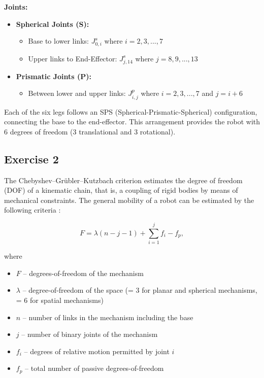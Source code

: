 \begin{solution}
\begin{description}
	\item \textbf{Joints:}
	\begin{itemize}
		\item \textbf{Spherical Joints (S):} 
		\begin{itemize}
			\item Base to lower links: $J^s_{0,i}$ where $i = 2, 3, ..., 7$
			\item Upper links to End-Effector: $J^s_{j,14}$ where $j = 8, 9, ..., 13$
		\end{itemize}
		\item \textbf{Prismatic Joints (P):} 
		\begin{itemize}
			\item Between lower and upper links: $J^p_{i,j}$ where $i = 2, 3, ..., 7$ and $j = i+6$
		\end{itemize}
	\end{itemize}
	
	\item[Structure:] Each of the six legs follows an SPS (Spherical-Prismatic-Spherical) configuration, connecting the base to the end-effector. This arrangement provides the robot with 6 degrees of freedom (3 translational and 3 rotational).
\end{description}
\end{solution}





\subsection{Exercise 2}

The Chebyshev–Grübler–Kutzbach criterion estimates the degree of freedom (DOF) of a kinematic chain, that is, a coupling of rigid bodies by means of mechanical constraints. The general mobility of a robot can be estimated by the following criteria \cite{taghirad2013parallel}:

\begin{equation}
    F = \lambda(n - j - 1) + \sum_{i=1}^j f_i - f_p,
    \label{eq:cgk_extended}
\end{equation}

where
\begin{itemize}
    \item $F$ – degrees-of-freedom of the mechanism
    \item $\lambda$ – degree-of-freedom of the space (= 3 for planar and spherical mechanisms, = 6 for spatial mechanisms)
    \item $n$ – number of links in the mechanism including the base
    \item $j$ – number of binary joints of the mechanism
    \item $f_i$ – degrees of relative motion permitted by joint $i$
    \item $f_p$ – total number of passive degrees-of-freedom
\end{itemize}

